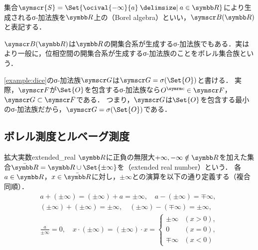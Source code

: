 \documentclass[../../main]{subfiles}
\begin{document}
\begin{example}[ボレル集合族]
  集合\(\symscr{S}=\Set{\ocival{-\infty}{a}\given a\in\numset{R}}\)により生成されるσ‐加法族を\(\numset{R}\)上の（Borel algebra）といい，\(\borelset{\numset{R}}\)と表記する．
\end{example}

\begin{note}
  \(\borelset{\numset{R}}\)は\(\numset{R}\)の開集合系が生成するσ‐加法族でもある．実はより一般に，位相空間の開集合系が生成するσ‐加法族のことをボレル集合族という．
\end{note}

\begin{example}
  \cref{example:dice}のσ‐加法族\(\sigmaalg{G}\)は\(\sigmaalg{G}=\sigmagen{\Set{O}}\)と書ける．
  実際，\(\sigmaalg{F}\)が\(\Set{O}\)を包含するσ‐加法族なら\(\scomp{O}\in\sigmaalg{F}\)，\(\sigmaalg{G}\subset\sigmaalg{F}\)である．
  つまり，\(\sigmaalg{G}\)は\(\Set{O}\)を包含する最小のσ‐加法族だから，\(\sigmaalg{G}=\sigmagen{\Set{O}}\)である．
\end{example}

\subsection{ボレル測度とルベーグ測度}

\begin{definition}{拡大実数}{extended_real}
  \(\numset{R}\)に正負の無限大\(+\infty,-\infty\notin\numset{R}\)を加えた集合\(\extendedreal=\numset{R}\cup\Set{\pm\infty}\)を（extended real number）という．
  各\(a\in\numset{R}\)，\(x\in\extendedreal\)に対し，\(\pm\infty\)との演算を以下の通り定義する（複合同順）．
  \begin{gather*}
    a+(\pm\infty) = (\pm\infty)+a = \pm\infty,
    \quad a-(\pm\infty) = \mp\infty, \\
    (\pm\infty)+(\pm\infty) = \pm\infty,
    \quad(\pm\infty)-(\mp\infty) = \pm\infty, \\
    \frac{a}{\pm\infty} = 0,
    \quad x\cdot(\pm\infty) = (\pm\infty)\cdot x = \begin{cases}\pm\infty & (x>0),\\ 0 & (x=0), \\ \mp\infty & (x<0)\end{cases}
  \end{gather*}
\end{definition}
\end{document}
